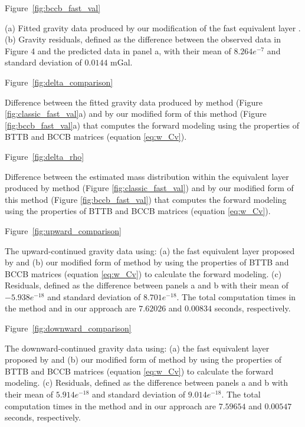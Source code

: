 \documentclass[manuscript,revised]{geophysics}
\begin{document}
Figure~\ref{fig:bccb_fast_val}

{(a) Fitted gravity data produced by our modification of the fast equivalent layer \citep{siqueira-etal2017}. (b) Gravity residuals, defined as the difference between the observed data in Figure 4 and the predicted data in panel a, with their mean of $8.264e^{-7}$ and standard deviation of $0.0144$ mGal.}
\newpage

Figure~\ref{fig:delta_comparison}

{Difference between the fitted gravity data produced by \citet{siqueira-etal2017} method (Figure \ref{fig:classic_fast_val}a) and by our modified form of this method (Figure \ref{fig:bccb_fast_val}a) that computes the forward modeling using the properties of BTTB and BCCB matrices (equation \ref{eq:w_Cv}).}
\newpage

Figure~\ref{fig:delta_rho}

{Difference between the estimated mass distribution within the equivalent layer produced by \citet{siqueira-etal2017} method (Figure \ref{fig:classic_fast_val}) and by our modified form of this method (Figure \ref{fig:bccb_fast_val}) that computes the forward modeling using the properties of BTTB and BCCB matrices (equation \ref{eq:w_Cv}).}
\newpage

Figure~\ref{fig:upward_comparison}

{The upward-continued gravity data using: (a) the fast equivalent layer proposed by \citet{siqueira-etal2017} and (b) our modified form of \citet{siqueira-etal2017} method by using the properties of BTTB and BCCB matrices (equation \ref{eq:w_Cv}) to calculate the forward modeling.  (c) Residuals, defined as the difference between panels a and b with their mean of $-5.938e^{-18}$ and standard deviation of $8.701e^{-18}$.  The total computation times in the \citet{siqueira-etal2017} method and in our approach are $7.62026$ and $0.00834$ seconds, respectively.}
\newpage

Figure~\ref{fig:downward_comparison}

{The downward-continued gravity data using: (a) the fast equivalent layer proposed by \citet{siqueira-etal2017} and (b) our modified form of \citet{siqueira-etal2017} method by using the properties of BTTB and BCCB matrices (equation \ref{eq:w_Cv}) to calculate the forward modeling.  (c) Residuals, defined as the difference between panels a and b with their mean of $5.914e^{-18}$ and standard deviation of $9.014e^{-18}$.  The total computation times in the \citet{siqueira-etal2017} method and in our approach are $7.59654$ and $0.00547$ seconds, respectively.}
\newpage
\end{document}
